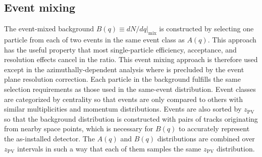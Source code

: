\subsection{Event mixing}
\label{subsec:evt_mixing}
The event-mixed background $B(q) \equiv \left. dN/dq \right|_{\textrm{mix}}$ is constructed by selecting one particle from each of two events in the same event class as $A(q)$.
This approach has the useful property that most single-particle efficiency, acceptance, and resolution effects cancel in the ratio.
This event mixing approach is therefore used except in the azimuthally-dependent analysis where is precluded by the event plane resolution correction.
Each particle in the background fulfills the same selection requirements as those used in the same-event distribution.
Event classes are categorized by centrality so that events are only compared to others with similar multiplicities and momentum distributions.
Events are also sorted by $z_\textrm{PV}$ so that the background distribution is constructed with pairs of tracks originating from nearby space points, which is necessary for $B(q)$ to accurately represent the as-installed detector.
The $A(q)$ and $B(q)$ distributions are combined over $z_\textrm{PV}$ intervals in such a way that each of them samples the same $z_\textrm{PV}$ distribution.

